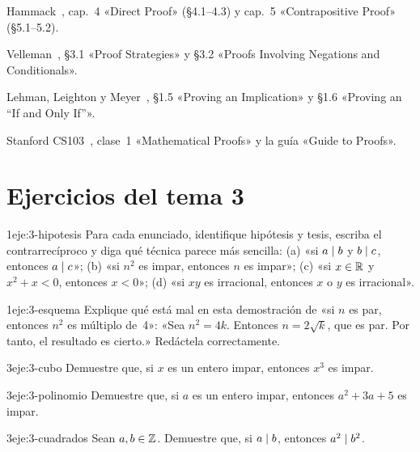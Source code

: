 \begin{lecturas}
\item Hammack~\cite{hammack}, cap.~4 «Direct Proof» (§4.1–4.3) y cap.~5 «Contrapositive Proof» (§5.1–5.2).
\item Velleman~\cite{velleman}, §3.1 «Proof Strategies» y §3.2 «Proofs Involving Negations and Conditionals».
\item Lehman, Leighton y Meyer~\cite{mcs}, §1.5 «Proving an Implication» y §1.6 «Proving an “If and Only If”».
\item Stanford CS103~\cite{cs103}, clase~1 «Mathematical Proofs» y la guía «Guide to Proofs».
\end{lecturas}

\section*{Ejercicios del tema 3}

\begin{ejercicio}{1}{eje:3-hipotesis}
Para cada enunciado, identifique hipótesis y tesis, escriba el contrarrecíproco y diga qué técnica parece más sencilla: (a) «si $a\mid b$ y $b\mid c$, entonces $a\mid c$»; (b) «si $n^{2}$ es impar, entonces $n$ es impar»; (c) «si $x\in\mathbb{R}$ y $x^{2}+x<0$, entonces $x<0$»; (d) «si $xy$ es irracional, entonces $x$ o $y$ es irracional».
\end{ejercicio}

\begin{ejercicio}{1}{eje:3-esquema}
Explique qué está mal en esta demostración de «si $n$ es par, entonces $n^{2}$ es múltiplo de~4»: «Sea $n^{2}=4k$. Entonces $n=2\sqrt{k}$, que es par. Por tanto, el resultado es cierto.» Redáctela correctamente.
\end{ejercicio}

\begin{ejercicio}{3}{eje:3-cubo}
Demuestre que, si $x$ es un entero impar, entonces $x^{3}$ es impar.
\end{ejercicio}

\begin{ejercicio}{3}{eje:3-polinomio}
Demuestre que, si $a$ es un entero impar, entonces $a^{2}+3a+5$ es impar.
\end{ejercicio}

\begin{ejercicio}{3}{eje:3-cuadrados}
Sean $a,b\in\mathbb{Z}$. Demuestre que, si $a\mid b$, entonces $a^{2}\mid b^{2}$.
\end{ejercicio}

